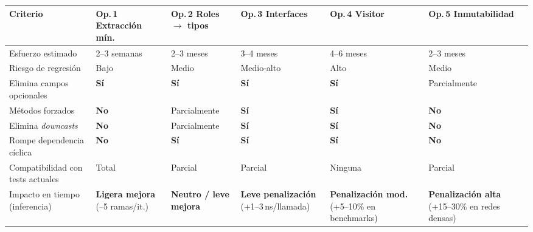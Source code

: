 \documentclass[11pt,a4paper]{article}
\newcommand{\bad}[1]{\textcolor{codered}{\textbf{#1}}}
\newcommand{\good}[1]{\textcolor{codegreen}{\textbf{#1}}}
\newcommand{\warn}[1]{\textcolor{warnorange}{\textbf{#1}}}
\begin{document}
\begin{landscape}
\begin{table}[p]
\centering
\small
\setlength{\tabcolsep}{5pt}
\begin{tabular}{lp{2.8cm}p{2.8cm}p{2.8cm}p{2.8cm}p{2.8cm}}
\toprule
\textbf{Criterio}
  & \textbf{Op.\,1} \newline Extracción mín.
  & \textbf{Op.\,2} \newline Roles $\to$ tipos
  & \textbf{Op.\,3} \newline Interfaces
  & \textbf{Op.\,4} \newline Visitor
  & \textbf{Op.\,5} \newline Inmutabilidad \\
\midrule
\rowcolor{lightgray}
Esfuerzo estimado
  & 2--3 semanas
  & 2--3 meses
  & 3--4 meses
  & 4--6 meses
  & 2--3 meses \\

Riesgo de regresión
  & Bajo
  & Medio
  & Medio-alto
  & Alto
  & Medio \\

\rowcolor{lightgray}
Elimina campos opcionales
  & \good{Sí}
  & \good{Sí}
  & \good{Sí}
  & \good{Sí}
  & Parcialmente \\

Métodos forzados
  & \bad{No}
  & Parcialmente
  & \good{Sí}
  & \good{Sí}
  & \bad{No} \\

\rowcolor{lightgray}
Elimina \emph{downcasts}
  & \bad{No}
  & Parcialmente
  & \good{Sí}
  & \good{Sí}
  & \bad{No} \\

Rompe dependencia cíclica
  & \bad{No}
  & \good{Sí}
  & \good{Sí}
  & \good{Sí}
  & \bad{No} \\

\rowcolor{lightgray}
Compatibilidad con tests actuales
  & Total
  & Parcial
  & Parcial
  & Ninguna
  & Parcial \\

Impacto en tiempo (inferencia)
  & \good{Ligera mejora} \newline (\textminus2--5 ramas/it.)
  & \good{Neutro / leve mejora}
  & \warn{Leve penalización} \newline (+1--3\,ns/llamada)
  & \warn{Penalización mod.} \newline (+5--10\% en benchmarks)
  & \bad{Penalización alta} \newline (+15--30\% en redes densas) \\


\end{tabular}
\end{table}
\end{landscape}
\end{document}
